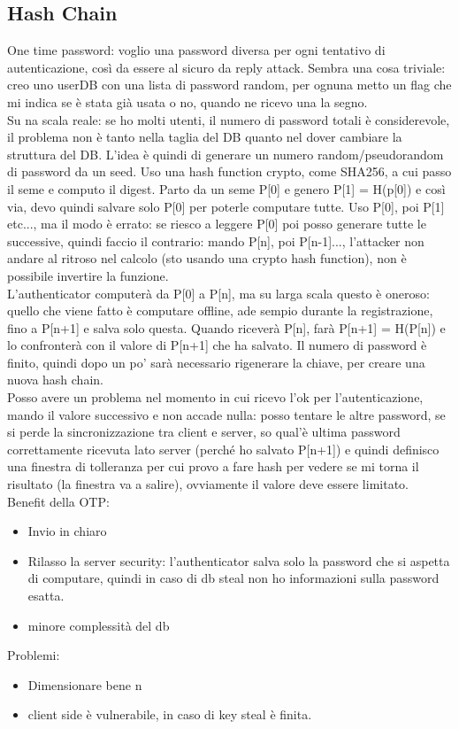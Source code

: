 \documentclass[16px]{article}
\begin{document}
\subsection{Hash Chain}
One time password: voglio una password diversa per ogni tentativo di autenticazione, così da essere al sicuro da reply attack. Sembra una cosa triviale: creo uno userDB con una lista di password random, per ognuna metto un flag che mi indica se è stata già usata o no, quando ne ricevo una la segno.\\ Su na scala reale: se ho molti utenti, il numero di password totali è considerevole, il problema non è tanto nella taglia del DB quanto nel dover cambiare la struttura del DB. L'idea è quindi di generare un numero random/pseudorandom di password da un seed. Uso una hash function crypto, come SHA256, a cui passo il seme e computo il digest. Parto da un seme P[0] e genero P[1] = H(p[0]) e così via, devo quindi salvare solo P[0] per poterle computare tutte. Uso P[0], poi P[1] etc..., ma il modo è errato: se riesco a leggere P[0] poi posso generare tutte le successive, quindi faccio il contrario: mando P[n], poi P[n-1]..., l'attacker non andare al ritroso nel calcolo (sto usando una crypto hash function), non è possibile invertire la funzione.\\ L'authenticator computerà da P[0] a P[n], ma su larga scala questo è oneroso: quello che viene fatto è computare offline, ade sempio durante la registrazione, fino a P[n+1] e salva solo questa. Quando riceverà P[n], farà P[n+1] = H(P[n]) e lo confronterà con il valore di P[n+1] che ha salvato. Il numero di password è finito, quindi dopo un po' sarà necessario rigenerare la chiave, per creare una nuova hash chain. \\ Posso avere un problema nel momento in cui ricevo l'ok per l'autenticazione, mando il valore successivo e non accade nulla: posso tentare le altre password, se si perde la sincronizzazione tra client e server, so qual'è ultima password correttamente ricevuta lato server (perché ho salvato P[n+1]) e quindi definisco una finestra di tolleranza per cui provo a fare hash per vedere se mi torna il risultato (la finestra va a salire), ovviamente il valore deve essere limitato.\\ Benefit della OTP:
\begin{itemize}
\item Invio in chiaro
\item Rilasso la server security: l'authenticator salva solo la password che si aspetta di computare, quindi in caso di db steal non ho informazioni sulla password esatta.
\item minore complessità del db
\end{itemize}
Problemi:
\begin{itemize}
\item Dimensionare bene n
\item client side è vulnerabile, in caso di key steal è finita.
\end{itemize}
\end{document}
